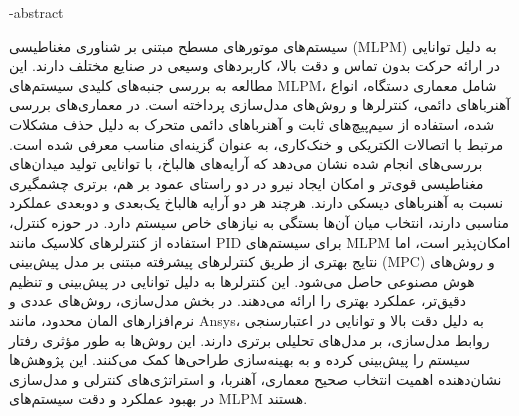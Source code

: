 %
\fa-abstract{
سیستم‌های موتورهای مسطح مبتنی بر شناوری مغناطیسی (MLPM) به دلیل توانایی در ارائه حرکت بدون تماس و دقت بالا، کاربردهای وسیعی در صنایع مختلف دارند. این مطالعه به بررسی جنبه‌های کلیدی سیستم‌های MLPM، شامل معماری دستگاه، انواع آهنرباهای دائمی، کنترلرها و روش‌های مدل‌سازی پرداخته است.
در معماری‌های بررسی شده، استفاده از سیم‌پیچ‌های ثابت و آهنرباهای دائمی متحرک به دلیل حذف مشکلات مرتبط با اتصالات الکتریکی و خنک‌کاری، به عنوان گزینه‌ای مناسب معرفی شده است. بررسی‌های انجام شده نشان می‌دهد که آرایه‌های هالباخ، با توانایی تولید میدان‌های مغناطیسی قوی‌تر و امکان ایجاد نیرو در دو راستای عمود بر هم، برتری چشمگیری نسبت به آهنرباهای دیسکی دارند. هرچند هر دو آرایه هالباخ یک‌بعدی و دوبعدی عملکرد مناسبی دارند، انتخاب میان آن‌ها بستگی به نیازهای خاص سیستم دارد.
در حوزه کنترل، استفاده از کنترلرهای کلاسیک مانند PID برای سیستم‌های MLPM امکان‌پذیر است، اما نتایج بهتری از طریق کنترلرهای پیشرفته مبتنی بر مدل پیش‌بینی (MPC) و روش‌های هوش مصنوعی حاصل می‌شود. این کنترلرها به دلیل توانایی در پیش‌بینی و تنظیم دقیق‌تر، عملکرد بهتری را ارائه می‌دهند.
در بخش مدل‌سازی، روش‌های عددی و نرم‌افزارهای المان محدود، مانند Ansys، به دلیل دقت بالا و توانایی در اعتبارسنجی روابط مدل‌سازی، بر مدل‌های تحلیلی برتری دارند. این روش‌ها به طور مؤثری رفتار سیستم را پیش‌بینی کرده و به بهینه‌سازی طراحی‌ها کمک می‌کنند.
این پژوهش‌ها نشان‌دهنده اهمیت انتخاب صحیح معماری، آهنربا، و استراتژی‌های کنترلی و مدل‌سازی در بهبود عملکرد و دقت سیستم‌های MLPM هستند.

}




